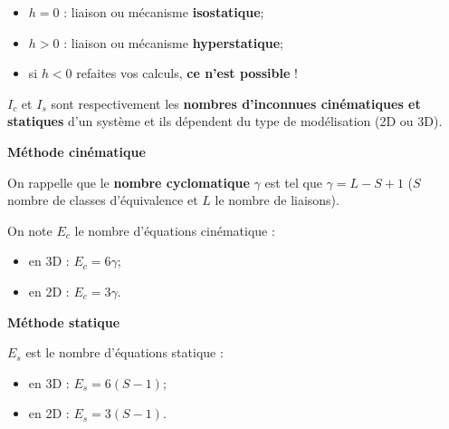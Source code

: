 \begin{itemize}
\item $h=0$ : liaison ou mécanisme \textbf{isostatique};
\item $h>0$ : liaison ou mécanisme \textbf{hyperstatique};
\item si $h<0$ refaites vos calculs, \textbf{ce n'est possible} !  
\end{itemize}







\begin{defi}[Notations]

$I_c$ et $I_s$ sont respectivement les \textbf{nombres d'inconnues cinématiques et statiques} d'un système et ils dépendent du type de modélisation (2D ou 3D).


\begin{multicols}{2}
\begin{center}
\textbf{Méthode cinématique}
\end{center}


On rappelle que le \textbf{nombre cyclomatique}  $\gamma$
est tel que $\gamma=L-S+1$ ($S$ nombre de classes d'équivalence et $L$ le nombre de liaisons).

On note $E_c$ le nombre d'équations cinématique :%
\begin{itemize}
 \item en 3D : $E_c=6\gamma$;%
 \item en 2D : $E_c=3\gamma$.%
\end{itemize}

\vfill\null
\columnbreak

\begin{center}
\textbf{Méthode statique} 
\end{center}


$E_s$ est le nombre d'équations statique :
\begin{itemize}
\item en 3D : $E_s=6 (S-1)$;
\item en 2D : $E_s=3 (S-1)$.
\end{itemize}

\end{multicols}
\end{defi}


